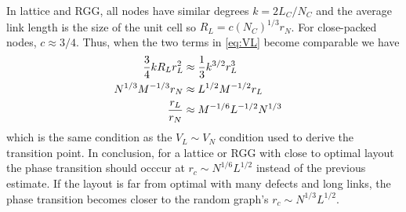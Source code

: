 \documentclass[linenumbers,endfloats,nofootinbib,preprint,floatfix,titlepage,superscriptaddress]{revtex4-1} %
\begin{document}
In lattice and RGG, all nodes have similar degrees $k =2 L_C/N_C$ and the average link length is the size of the unit cell so $R_L = c(N_C)^{1/3} r_N$. 
For close-packed nodes, $c \approx 3/4$. 
Thus, when the two terms in \eqref{eq:VL} become comparable we have 
\begin{align}
    {3\over 4} k R_L r_L^2 & \approx {1\over 3} k^{3/2} r_L^3 \cr 
    N^{1/3}M^{-1/3} r_N &\approx L^{1/2} M^{-1/2} r_L \cr
    {r_L \over r_N } &\approx M^{-1/6 } L^{-1/2} N^{1/3}
\end{align}
which is the same condition as the $V_L \sim V_N$ condition used to derive the transition point. 
In conclusion, for a lattice or RGG with close to optimal layout the phase transition should occcur at $r_c \sim N^{1/6} L^{1/2} $ instead of the previous estimate. 
If the layout is far from optimal with many defects and long links, the phase transition becomes closer to the random graph's $r_c \sim N^{1/3} L^{1/2}$. 
\end{document}
